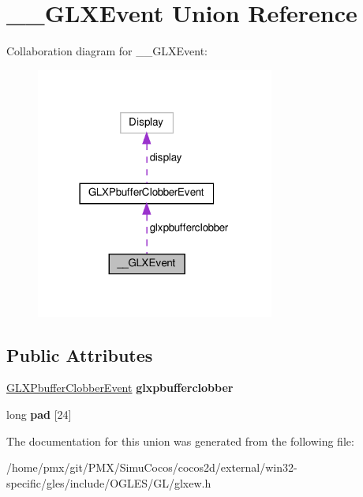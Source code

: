 \hypertarget{union____GLXEvent}{}\section{\+\_\+\+\_\+\+G\+L\+X\+Event Union Reference}
\label{union____GLXEvent}


Collaboration diagram for \+\_\+\+\_\+\+G\+L\+X\+Event\+:
\nopagebreak
\begin{figure}[H]
\begin{center}
\leavevmode
\includegraphics[width=222pt]{union____GLXEvent__coll__graph}
\end{center}
\end{figure}
\subsection*{Public Attributes}
\begin{DoxyCompactItemize}
\item 
\mbox{\label{union____GLXEvent_ada5880e2b424bcb2f60a411aaf713fae}} 
\hyperlink{structGLXPbufferClobberEvent}{G\+L\+X\+Pbuffer\+Clobber\+Event} {\bfseries glxpbufferclobber}
\item 
\mbox{\label{union____GLXEvent_ab9dd153b4b59af2a1fc3b10807f0f481}} 
long {\bfseries pad} \mbox{[}24\mbox{]}
\end{DoxyCompactItemize}


The documentation for this union was generated from the following file\+:\begin{DoxyCompactItemize}
\item 
/home/pmx/git/\+P\+M\+X/\+Simu\+Cocos/cocos2d/external/win32-\/specific/gles/include/\+O\+G\+L\+E\+S/\+G\+L/glxew.\+h\end{DoxyCompactItemize}
